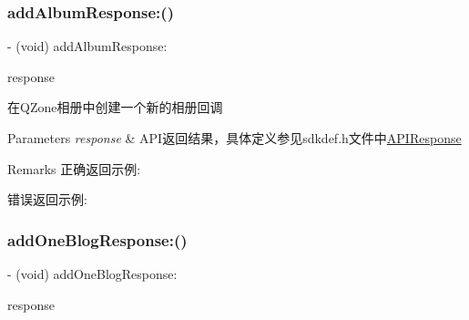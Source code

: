 \subsubsection{\texorpdfstring{add\+Album\+Response\+:()}{addAlbumResponse:()}\hspace{0.1cm}{\footnotesize\ttfamily [2/2]}}
{\footnotesize\ttfamily -\/ (void) add\+Album\+Response\+: \begin{DoxyParamCaption}\item[{(\mbox{\hyperlink{interface_a_p_i_response}{A\+P\+I\+Response}} $\ast$)}]{response }\end{DoxyParamCaption}\hspace{0.3cm}{\ttfamily [optional]}}

在\+Q\+Zone相册中创建一个新的相册回调 
\begin{DoxyParams}{Parameters}
{\em response} & A\+P\+I返回结果，具体定义参见sdkdef.\+h文件中\mbox{\hyperlink{interface_a_p_i_response}{A\+P\+I\+Response}} \\
\hline
\end{DoxyParams}
\begin{DoxyRemark}{Remarks}
正确返回示例\+: 
\begin{DoxyCodeInclude}
\end{DoxyCodeInclude}
 错误返回示例\+: 
\begin{DoxyCodeInclude}
\end{DoxyCodeInclude}

\end{DoxyRemark}
\mbox{\label{protocol_tencent_session_delegate-p_a3ba2a0c6a9f2444218b6acef8daf30d6}} 
\subsubsection{\texorpdfstring{add\+One\+Blog\+Response\+:()}{addOneBlogResponse:()}\hspace{0.1cm}{\footnotesize\ttfamily [1/2]}}
{\footnotesize\ttfamily -\/ (void) add\+One\+Blog\+Response\+: \begin{DoxyParamCaption}\item[{(\mbox{\hyperlink{interface_a_p_i_response}{A\+P\+I\+Response}} $\ast$)}]{response }\end{DoxyParamCaption}\hspace{0.3cm}{\ttfamily [optional]}}

